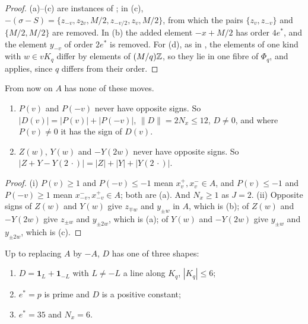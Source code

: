 \begin{proof}
(a)--(c) are instances of ; in (c),
$-(\sigma-S)=\{z_{-v},z_{2v},M/2,z_{-v/2},z_{v},M/2\}$, from which the pairs
$\{z_{v},z_{-v}\}$ and $\{M/2,M/2\}$ are removed. In (b) the added element
$-x+M/2$ has order $4e^{*}$, and the element $y_{-v}$ of order $2e^{*}$ is
removed. For (d), as in , the elements of one kind with
$w\in vK_{q}$ differ by elements of $(M/q)\mathbb{Z}$, so they lie in one fibre of
$\Phi_{q}$, and  applies, since $q$ differs from their
order.
\end{proof}

From now on $A$ has none of these moves.

\begin{lemma}\label{lem:foursigns}
\begin{enumerate}[label=\textup{(\roman*)}]
\item $P(v)$ and $P(-v)$ never have opposite signs. So
$|D(v)|=|P(v)|+|P(-v)|$, $\|D\|=2N_{x}\le12$, $D\ne0$, and where $P(v)\ne0$
it has the sign of $D(v)$.
\item $Z(w)$, $Y(w)$ and $-Y(2w)$ never have opposite signs. So
$|Z+Y-Y(2\,\cdot)|=|Z|+|Y|+|Y(2\,\cdot)|$.
\end{enumerate}
\end{lemma}

\begin{proof}
(i) $P(v)\ge1$ and $P(-v)\le-1$ mean $x^{+}_{v},x^{-}_{v}\in A$, and
$P(v)\le-1$ and $P(-v)\ge1$ mean $x^{-}_{-v},x^{+}_{-v}\in A$; both are
(a). And $N_{x}\ge1$ as $J=2$. (ii) Opposite signs of
$Z(w)$ and $Y(w)$ give $z_{\mp w}$ and $y_{\pm w}$ in $A$, which is (b); of
$Z(w)$ and $-Y(2w)$ give $z_{\pm w}$ and $y_{\pm2w}$, which is (a); of $Y(w)$
and $-Y(2w)$ give $y_{\pm w}$ and $y_{\pm2w}$, which is (c).
\end{proof}

\begin{lemma}\label{lem:evencore}
Up to replacing $A$ by $-A$, $D$ has one of three shapes:
\begin{enumerate}[label=\textup{(\Roman*)}]
\item $D=\mathbf 1_{L}+\mathbf 1_{-L}$ with $L\ne-L$ a line along $K_{q}$,
$|K_{q}|\le6$;
\item $e^{*}=p$ is prime and $D$ is a positive constant;
\item $e^{*}=35$ and $N_{x}=6$.
\end{enumerate}
\end{lemma}

